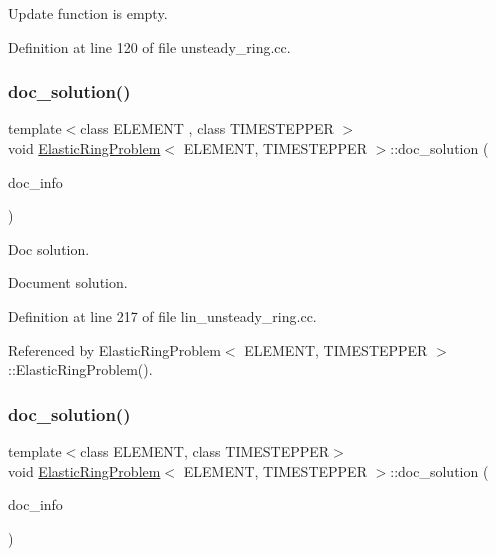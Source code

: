 Update function is empty. 



Definition at line 120 of file unsteady\+\_\+ring.\+cc.

\mbox{\label{classElasticRingProblem_a9aa904e4cf82d45711f890cd8440ced9}} 
\subsubsection{\texorpdfstring{doc\+\_\+solution()}{doc\_solution()}\hspace{0.1cm}{\footnotesize\ttfamily [1/2]}}
{\footnotesize\ttfamily template$<$class E\+L\+E\+M\+E\+NT , class T\+I\+M\+E\+S\+T\+E\+P\+P\+ER $>$ \\
void \hyperlink{classElasticRingProblem}{Elastic\+Ring\+Problem}$<$ E\+L\+E\+M\+E\+NT, T\+I\+M\+E\+S\+T\+E\+P\+P\+ER $>$\+::doc\+\_\+solution (\begin{DoxyParamCaption}\item[{Doc\+Info \&}]{doc\+\_\+info }\end{DoxyParamCaption})}



Doc solution. 

Document solution. 

Definition at line 217 of file lin\+\_\+unsteady\+\_\+ring.\+cc.



Referenced by Elastic\+Ring\+Problem$<$ E\+L\+E\+M\+E\+N\+T, T\+I\+M\+E\+S\+T\+E\+P\+P\+E\+R $>$\+::\+Elastic\+Ring\+Problem().

\mbox{\label{classElasticRingProblem_a9aa904e4cf82d45711f890cd8440ced9}} 
\subsubsection{\texorpdfstring{doc\+\_\+solution()}{doc\_solution()}\hspace{0.1cm}{\footnotesize\ttfamily [2/2]}}
{\footnotesize\ttfamily template$<$class E\+L\+E\+M\+E\+NT, class T\+I\+M\+E\+S\+T\+E\+P\+P\+ER$>$ \\
void \hyperlink{classElasticRingProblem}{Elastic\+Ring\+Problem}$<$ E\+L\+E\+M\+E\+NT, T\+I\+M\+E\+S\+T\+E\+P\+P\+ER $>$\+::doc\+\_\+solution (\begin{DoxyParamCaption}\item[{Doc\+Info \&}]{doc\+\_\+info }\end{DoxyParamCaption})}



